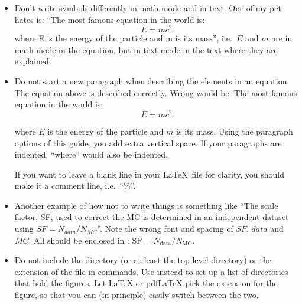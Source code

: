 \begin{itemize}
\item Don't write symbols differently in math mode and in text. One of
  my pet hates is:
  \enquote{The most famous equation in the world is:
  \begin{equation}
    \label{eq:emc1}
    E = m c^{2}
  \end{equation}
  where E is the energy of the particle and m is its mass}, i.e.\ \(E\)
  and \(m\) are in math mode in the equation, but in text mode in the
  text where they are explained.

\item Do not start a new paragraph when describing the elements in an equation.
  The equation above is described correctly. Wrong would be:
  The most famous equation in the world is:
  \begin{equation}
    \label{eq:emc2}
    E = m c^{2}
  \end{equation}

  \hspace*{1em}where \(E\) is the energy of the particle and \(m\) is its mass.
  Using the paragraph options of this guide, you add extra vertical space.
  If your paragraphs are indented, \enquote{where} would also be indented.

  If you want to leave a blank line in your \LaTeX\ file for clarity,
  you should make it a comment line, i.e.\ \enquote{\%}.

\item Another example of how not to write things is something like
  \enquote{The scale factor, SF, used to correct the MC is determined in
  an independent dataset using \(SF = N_{data} / N_{MC}\)}. Note the
  wrong font and spacing of \(SF\), \(data\) and \(MC\). All should be
  enclosed in : \(\text{SF} = N_{\text{data}} / N_{\text{MC}}\).

\item Do not include the directory (or at least the top-level directory)
  or the extension of the file in  commands.
  Use 
  instead to set up a list of directories that hold the
  figures. Let \LaTeX{} or pdf\LaTeX{} pick
  the extension for the figure, so that you can (in principle) easily
  switch between the two.


\end{itemize}
